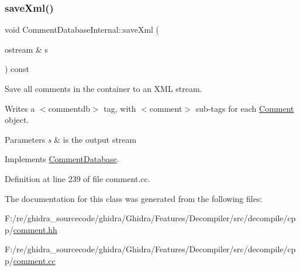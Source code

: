 \subsubsection{\texorpdfstring{saveXml()}{saveXml()}}
{\footnotesize\ttfamily void Comment\+Database\+Internal\+::save\+Xml (\begin{DoxyParamCaption}\item[{ostream \&}]{s }\end{DoxyParamCaption}) const\hspace{0.3cm}{\ttfamily [virtual]}}



Save all comments in the container to an X\+ML stream. 

Writes a $<$commentdb$>$ tag, with $<$comment$>$ sub-\/tags for each \mbox{\hyperlink{class_comment}{Comment}} object. 
\begin{DoxyParams}{Parameters}
{\em s} & is the output stream \\
\hline
\end{DoxyParams}


Implements \mbox{\hyperlink{class_comment_database_ab80e2cbdabe2e275695c5980b8f8eb9a}{Comment\+Database}}.



Definition at line 239 of file comment.\+cc.



The documentation for this class was generated from the following files\+:\begin{DoxyCompactItemize}
\item 
F\+:/re/ghidra\+\_\+sourcecode/ghidra/\+Ghidra/\+Features/\+Decompiler/src/decompile/cpp/\mbox{\hyperlink{comment_8hh}{comment.\+hh}}\item 
F\+:/re/ghidra\+\_\+sourcecode/ghidra/\+Ghidra/\+Features/\+Decompiler/src/decompile/cpp/\mbox{\hyperlink{comment_8cc}{comment.\+cc}}\end{DoxyCompactItemize}
